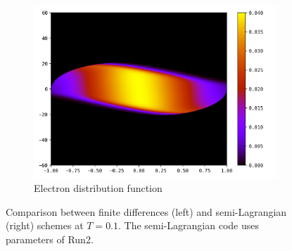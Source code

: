 \documentclass{article}
\numberwithin{equation}{section}
\newcommand{\imh}{\textheight} %
\newcommand{\imw}{\textwidth} %
\begin{document}
\begin{figure}
\begin{subfigure}{\textwidth}
		\includegraphics[height=\imh,width=\imw]{images/feT0p1.png}
		\caption{Electron distribution function}
		\label{subfig:compT01_electron}
	\end{subfigure}
	\caption{Comparison between finite differences (left) and semi-Lagrangian (right) schemes at $T=0.1$. The semi-Lagrangian code uses parameters of Run2.}
	\label{fig:compT01}
\end{figure}  
\end{document}
